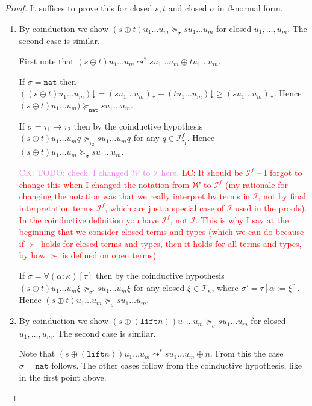 \documentclass[a4paper,UKenglish,cleveref,autoref,numberwithinsect]{lipics-v2019}
\theoremstyle{definition}
\newcommand{\Iterms}{\mathcal{I}}
\newcommand{\arrtype}{\rightarrow}
\newcommand{\subst}[2]{#1:=#2}
\newcommand{\nat}{\mathtt{nat}}
\newcommand{\lift}{\mathtt{lift}}
\newcommand{\Tc}{\mathcal{T}}
\newcommand{\da}{\mathord{\downarrow}}
\newcommand{\CK}[1]{\textcolor{violet}{CK: #1}}
\newcommand{\LC}[1]{\textcolor{red}{LC: #1}}
\begin{document}
\begin{proof}
  It suffices to prove this for closed $s,t$ and closed $\sigma$ in
  $\beta$-normal form.
  \begin{enumerate}
  \item By coinduction we show $(s \oplus t) u_1 \ldots u_m
    \succeq_\sigma s u_1 \ldots u_m$ for closed $u_1,\ldots,u_m$. The
    second case is similar.

    First note that $(s \oplus t) u_1 \ldots u_m \leadsto^* s u_1
    \ldots u_m \oplus t u_1 \ldots u_m$.

    If $\sigma = \nat$ then $((s \oplus t) u_1 \ldots u_m)\da = (s u_1
    \ldots u_m)\da + (t u_1 \ldots u_m)\da \ge (s u_1 \ldots
    u_m)\da$. Hence $(s \oplus t) u_1 \ldots u_m) \succeq_\nat s u_1
    \ldots u_m$.

    If $\sigma = \tau_1\arrtype\tau_2$ then by the coinductive
    hypothesis $(s \oplus t) u_1 \ldots u_m q \succeq_{\tau_2} s u_1
    \ldots u_m q$ for any $q \in \Iterms_{\tau_1}^f$. Hence $(s \oplus
    t) u_1 \ldots u_m \succeq_\sigma s u_1 \ldots u_m$.

    \CK{TODO: check: I changed $\mathcal{W}$ to $\Iterms$ here.}
    \LC{It should be $\Iterms^f$ -- I forgot to change this when I
      changed the notation from $\mathcal{W}$ to $\Iterms^f$ (my rationale
      for changing the notation was that we really interpret by terms
      in $\Iterms$, not by final interpretation terms $\Iterms^f$,
      which are just a special case of $\Iterms$ used in the
      proofs). In the coinductive definition you have $\Iterms^f$, not
      $\Iterms$. This is why I say at the beginning that we consider
      closed terms and types (which we can do because if $\succ$ holds
      for closed terms and types, then it holds for all terms and
      types, by how $\succ$ is defined on open terms)}

    If $\sigma = \forall(\alpha:\kappa)[\tau]$ then by the coinductive
    hypothesis $(s \oplus t) u_1 \ldots u_m \xi \succeq_{\sigma'} s
    u_1 \ldots u_m \xi$ for any closed $\xi \in \Tc_\kappa$, where
    $\sigma' = \tau[\subst{\alpha}{\xi}]$. Hence $(s \oplus t) u_1
    \ldots u_m \succeq_\sigma s u_1 \ldots u_m$.
  \item By coinduction we show $(s \oplus (\lift n)) u_1 \ldots u_m
    \succeq_\sigma s u_1 \ldots u_m$ for closed $u_1,\ldots,u_m$. The
    second case is similar.

    Note that $(s \oplus (\lift n)) u_1 \ldots u_m \leadsto^* s u_1
    \ldots u_m \oplus n$. From this the case $\sigma=\nat$
    follows. The other cases follow from the coinductive hypothesis,
    like in the first point above.\qedhere
  \end{enumerate}
\end{proof}
\end{document}
